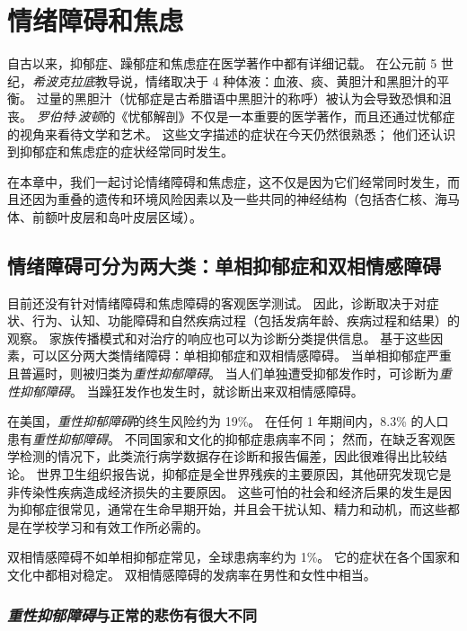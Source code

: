 \chapter{情绪障碍和焦虑} \label{chap:chap61}

自古以来，抑郁症、躁郁症和焦虑症在医学著作中都有详细记载。 
在公元前 5 世纪，\textit{希波克拉底}教导说，情绪取决于 4 种体液：血液、痰、黄胆汁和黑胆汁的平衡。
过量的黑胆汁（忧郁症是古希腊语中黑胆汁的称呼）被认为会导致恐惧和沮丧。
\textit{罗伯特$\cdot$波顿}的《忧郁解剖》不仅是一本重要的医学著作，而且还通过忧郁症的视角来看待文学和艺术。
这些文字描述的症状在今天仍然很熟悉；
他们还认识到抑郁症和焦虑症的症状经常同时发生。


在本章中，我们一起讨论情绪障碍和焦虑症，这不仅是因为它们经常同时发生，而且还因为重叠的遗传和环境风险因素以及一些共同的神经结构（包括杏仁核、海马体、前额叶皮层和岛叶皮层区域）。



\section{情绪障碍可分为两大类：单相抑郁症和双相情感障碍}

目前还没有针对情绪障碍和焦虑障碍的客观医学测试。
因此，诊断取决于对症状、行为、认知、功能障碍和自然疾病过程（包括发病年龄、疾病过程和结果）的观察。
家族传播模式和对治疗的响应也可以为诊断分类提供信息。
基于这些因素，可以区分两大类情绪障碍：单相抑郁症和双相情感障碍。
当单相抑郁症严重且普遍时，则被归类为\textit{重性抑郁障碍}。
当人们单独遭受抑郁发作时，可诊断为\textit{重性抑郁障碍}。
当躁狂发作也发生时，就诊断出来双相情感障碍。


在美国，\textit{重性抑郁障碍}的终生风险约为 19\%。
在任何 1 年期间内，8.3\% 的人口患有\textit{重性抑郁障碍}。
不同国家和文化的抑郁症患病率不同；
然而，在缺乏客观医学检测的情况下，此类流行病学数据存在诊断和报告偏差，因此很难得出比较结论。
世界卫生组织报告说，抑郁症是全世界残疾的主要原因，其他研究发现它是非传染性疾病造成经济损失的主要原因。
这些可怕的社会和经济后果的发生是因为抑郁症很常见，通常在生命早期开始，并且会干扰认知、精力和动机，而这些都是在学校学习和有效工作所必需的。


双相情感障碍不如单相抑郁症常见，全球患病率约为 1\%。
它的症状在各个国家和文化中都相对稳定。
双相情感障碍的发病率在男性和女性中相当。



\subsection{\textit{重性抑郁障碍}与正常的悲伤有很大不同}

